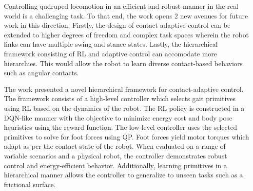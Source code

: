 \documentclass[11pt,letterpaper]{article}
\begin{document}
Controlling qudruped locomotion in an efficient and robust manner in the real world is a challenging task. To that end, the work opens 2 new avenues for future work in this direction. Firstly, the design of contact-adaptive control can be extended to higher degrees of freedom and complex task spaces wherein the robot links can have multiple swing and stance states. Lastly, the hierarchical framework consisting of RL and adaptive control can accomodate more hierarchies. This would allow the robot to learn diverse contact-based behaviors such as angular contacts. 

The work presented a novel hierarchical framework for contact-adaptive control. The framework consists of a high-level controller which selects gait primitives using RL based on the dynamics of the robot. The RL policy is constructed in a DQN-like manner with the objective to minimize energy cost and body pose heuristics using the reward function. The low-level controller uses the selected primitives to solve for foot forces using QP. Foot forces yield motor torques which adapt as per the contact state of the robot. When evaluated on a range of variable scenarios and a physical robot, the controller demonstrates robust control and energy-efficient behavior. Additionally, learning primitives in a hierarchical manner allows the controller to generalize to unseen tasks such as a frictional surface. 
\end{document}
